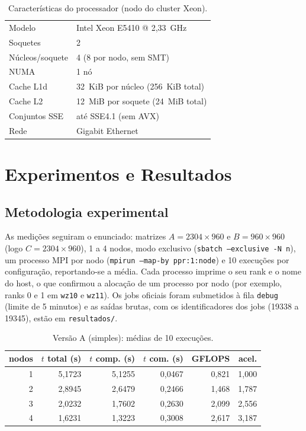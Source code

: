 \documentclass[conference]{IEEEtran}
\begin{document}
\begin{table}[!t]
\caption{Características do processador (nodo do cluster Xeon).}
\label{tab:cpu}
\centering
\begin{tabular}{ll}
\toprule
Modelo          & Intel Xeon E5410 @ 2,33~GHz \\
Soquetes        & 2 \\
Núcleos/soquete & 4 (8 por nodo, sem SMT) \\
NUMA            & 1 nó \\
Cache L1d       & 32~KiB por núcleo (256~KiB total) \\
Cache L2        & 12~MiB por soquete (24~MiB total) \\
Conjuntos SSE   & até SSE4.1 (sem AVX) \\
Rede            & Gigabit Ethernet \\
\bottomrule
\end{tabular}
\end{table}

\section{Experimentos e Resultados}

\subsection{Metodologia experimental}

As medições seguiram o enunciado: matrizes $A = 2304 \times 960$ e
$B = 960 \times 960$ (logo $C = 2304 \times 960$), 1 a 4 nodos, modo
exclusivo (\texttt{sbatch --exclusive -N n}), um processo MPI por nodo
(\texttt{mpirun --map-by ppr:1:node}) e 10 execuções por configuração,
reportando-se a média. Cada processo imprime o seu rank e o nome do host,
o que confirmou a alocação de um processo por nodo (por exemplo, ranks 0 e 1
em \texttt{wz10} e \texttt{wz11}). Os jobs oficiais foram submetidos à fila
\texttt{debug} (limite de 5 minutos) e as saídas brutas, com os
identificadores dos jobs (19338 a 19345), estão em \texttt{resultados/}.

\begin{table}[!t]
\caption{Versão A (simples): médias de 10 execuções.}
\label{tab:expA}
\centering
\begin{tabular}{rrrrrr}
\toprule
nodos & $t$ total (s) & $t$ comp. (s) & $t$ com. (s) & GFLOPS & acel. \\
\midrule
1 & 5,1723 & 5,1255 & 0,0467 & 0,821 & 1,000 \\
2 & 2,8945 & 2,6479 & 0,2466 & 1,468 & 1,787 \\
3 & 2,0232 & 1,7602 & 0,2630 & 2,099 & 2,556 \\
4 & 1,6231 & 1,3223 & 0,3008 & 2,617 & 3,187 \\
\bottomrule
\end{tabular}
\end{table}
\end{document}

